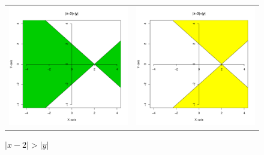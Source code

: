 \documentclass[12pt,b5paper]{ltjsarticle}
\begin{document}
\begin{enumerate}
\begin{figure}[h]
       \begin{tabular}{cc}
        \begin{minipage}[c]{200pt}
         \centering
         \includegraphics[scale=0.4]{dom_1_1.pdf}
         \caption{$\lvert x-2 \rvert > \lvert y \rvert$}
         \label{f1-1}
        \end{minipage} &
        \begin{minipage}[c]{200pt}
         \centering
         \includegraphics[scale=0.4]{dom_1_2.pdf}

\end{minipage}
\end{tabular}
\end{figure}
\end{enumerate}
\end{document}
